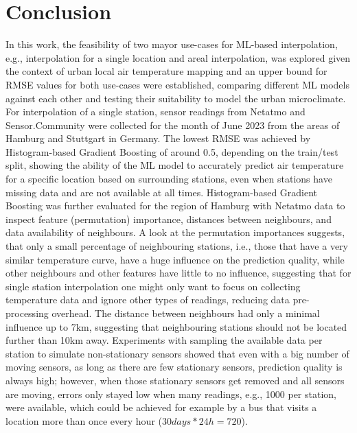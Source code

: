 \chapter{Conclusion}
\label{chap:Conclusion}

In this work, the feasibility of two mayor use-cases for ML-based interpolation, e.g., interpolation for a single location and areal interpolation, was explored given the context of urban local air temperature mapping and an upper bound for RMSE values for both use-cases were established, comparing different ML models against each other and testing their suitability to model the urban microclimate.\\
For interpolation of a single station, sensor readings from Netatmo and Sensor.Community were collected for the month of June 2023 from the areas of Hamburg and Stuttgart in Germany. The lowest RMSE was achieved by Histogram-based Gradient Boosting of around 0.5, depending on the train/test split, showing the ability of the ML model to accurately predict air temperature for a specific location based on surrounding stations, even when stations have missing data and are not available at all times. Histogram-based Gradient Boosting was further evaluated for the region of Hamburg with Netatmo data to inspect feature (permutation) importance, distances between neighbours, and data availability of neighbours. A look at the permutation importances suggests, that only a small percentage of neighbouring stations, i.e., those that have a very similar temperature curve, have a huge influence on the prediction quality, while other neighbours and other features have little to no influence, suggesting that for single station interpolation one might only want to focus on collecting temperature data and ignore other types of readings, reducing data pre-processing overhead. The distance between neighbours had only a minimal influence up to 7km, suggesting that neighbouring stations should not be located further than 10km away. Experiments with sampling the available data per station to simulate non-stationary sensors showed that even with a big number of moving sensors, as long as there are few stationary sensors, prediction quality is always high; however, when those stationary sensors get removed and all sensors are moving, errors only stayed low when many readings, e.g., 1000 per station, were available, which could be achieved for example by a bus that visits a location more than once every hour ($30 days * 24h = 720$). \\
